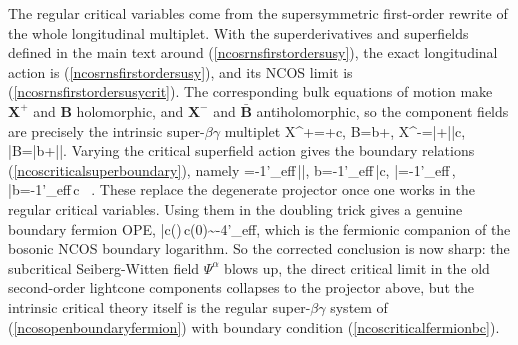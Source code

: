 \documentclass[12pt]{article}
\begin{document}
The regular critical variables come from the supersymmetric first-order rewrite of the whole longitudinal multiplet. With the superderivatives and superfields defined in the main text around (\ref{ncosrnsfirstordersusy}), the exact longitudinal action is (\ref{ncosrnsfirstordersusy}), and its NCOS limit is (\ref{ncosrnsfirstordersusycrit}). The corresponding bulk equations of motion make $\mathbf X^+$ and $\mathbf B$ holomorphic, and $\mathbf X^-$ and $\bar{\mathbf B}$ antiholomorphic, so the component fields are precisely the intrinsic super-$\beta\gamma$ multiplet
\ie
\mathbf X^+=\gamma+\vartheta c,\qquad
\mathbf B=b+\vartheta\beta,
\qquad
\mathbf X^-=\bar\gamma+\bar\vartheta\bar c,\qquad
\bar{\mathbf B}=\bar b+\bar\vartheta\bar\beta.
\fe
Varying the critical superfield action gives the boundary relations (\ref{ncoscriticalsuperboundary}), namely
\ie
\beta=-{1\A'_{\rm eff}}\,\bar\partial\bar\gamma,\qquad
b=-{1\A'_{\rm eff}}\,\bar c,
\qquad
\bar\beta=-{1\A'_{\rm eff}}\,\partial\gamma,\qquad
\bar b=-{1\A'_{\rm eff}}\,c
~\partial\Sigma.
\fe
These replace the degenerate projector once one works in the regular critical variables. Using them in the doubling trick gives a genuine boundary fermion OPE,
\ie
\bar c(\tau)\,c(0)\sim -{4\A'_{\rm eff}\over \tau},
\fe
which is the fermionic companion of the bosonic NCOS boundary logarithm. So the corrected conclusion is now sharp: the subcritical Seiberg-Witten field $\Psi^\alpha$ blows up, the direct critical limit in the old second-order lightcone components collapses to the projector above, but the intrinsic critical theory itself is the regular super-$\beta\gamma$ system of (\ref{ncosopenboundaryfermion}) with boundary condition (\ref{ncoscriticalfermionbc}).
\printbibliography
\end{document}

